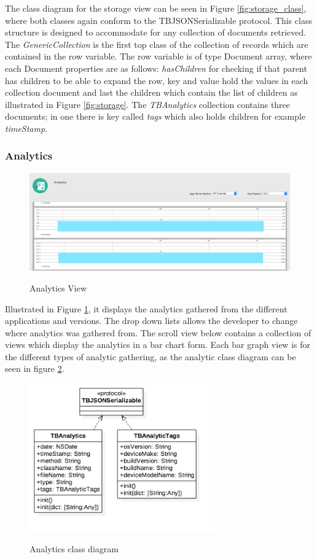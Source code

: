 The class diagram for the storage view can be seen in Figure \ref{fig:storage_class}, where both classes again conform to the TBJSONSerializable protocol. This class structure is designed to accommodate for any collection of documents retrieved. The \textit{GenericCollection} is the first top class of the collection of records which are contained in the row variable. The row variable is of type Document array, where each Document properties are as follows: \textit{hasChildren} for checking if that parent has children to be able to expand the row, key and value hold the values in each collection document and last the children which contain the list of children as illustrated in Figure \ref{fig:storage}. The \textit{TBAnalytics} collection contains three documents; in one there is key called \textit{tags} which also holds children for example \textit{timeStamp}.

\subsubsection{Analytics}

\begin{figure}[!h]
    \caption{Analytics View}
    \centering
    \includegraphics[width=120mm]{images/dashboard/analytics}
    \label{fig:analytics}
\end{figure}

Illustrated in Figure \ref{fig:analytics}, it displays the analytics gathered from the different applications and versions. The drop down lists allows the developer to change where analytics was gathered from. The scroll view below contains a collection of views which display the analytics in a bar chart form. Each bar graph view is for the different types of analytic gathering, as the analytic class diagram can be seen in figure \ref{fig:analytics_class}.

\begin{figure}[!h]
    \caption{Analytics class diagram}
    \centering
    \includegraphics[width=80mm]{images/classdiagrams/analytics_class}
    \label{fig:analytics_class}
\end{figure}

